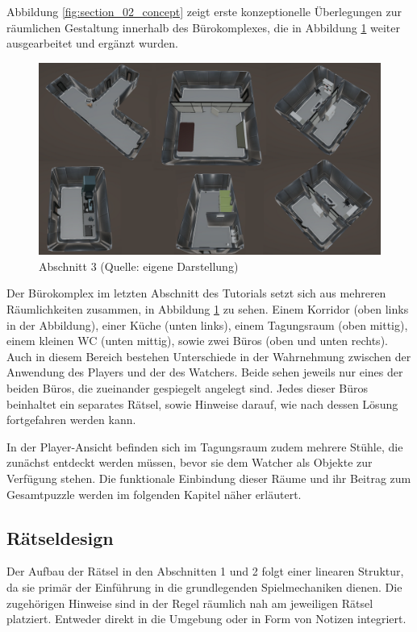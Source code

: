 Abbildung \ref{fig:section_02_concept} zeigt erste konzeptionelle Überlegungen zur räumlichen Gestaltung innerhalb des Bürokomplexes, die in Abbildung \ref{fig:section_02} weiter ausgearbeitet und ergänzt wurden.

\begin{figure}[ht]
\centering
\includegraphics[width=1\linewidth]{content/pictures/Abschnitt_02.png}
\caption{Abschnitt 3 (Quelle: eigene Darstellung)}
\label{fig:section_02}
\end{figure}

Der Bürokomplex im letzten Abschnitt des Tutorials setzt sich aus mehreren Räumlichkeiten zusammen, in Abbildung \ref{fig:section_02} zu sehen. Einem Korridor (oben links in der Abbildung), einer Küche (unten links), einem Tagungsraum (oben mittig), einem kleinen WC (unten mittig), sowie zwei Büros (oben und unten rechts). Auch in diesem Bereich bestehen Unterschiede in der Wahrnehmung zwischen der Anwendung des Players und der des Watchers. Beide sehen jeweils nur eines der beiden Büros, die zueinander gespiegelt angelegt sind. Jedes dieser Büros beinhaltet ein separates Rätsel, sowie Hinweise darauf, wie nach dessen Lösung fortgefahren werden kann.

In der Player-Ansicht befinden sich im Tagungsraum zudem mehrere Stühle, die zunächst entdeckt werden müssen, bevor sie dem Watcher als Objekte zur Verfügung stehen. Die funktionale Einbindung dieser Räume und ihr Beitrag zum Gesamtpuzzle werden im folgenden Kapitel \emph{} näher erläutert.

\subsection{Rätseldesign}\label{sec:riddles}

Der Aufbau der Rätsel in den Abschnitten 1 und 2 folgt einer linearen Struktur, da sie primär der Einführung in die grundlegenden Spielmechaniken dienen. Die zugehörigen Hinweise sind in der Regel räumlich nah am jeweiligen Rätsel platziert. Entweder direkt in die Umgebung oder in Form von Notizen integriert.

